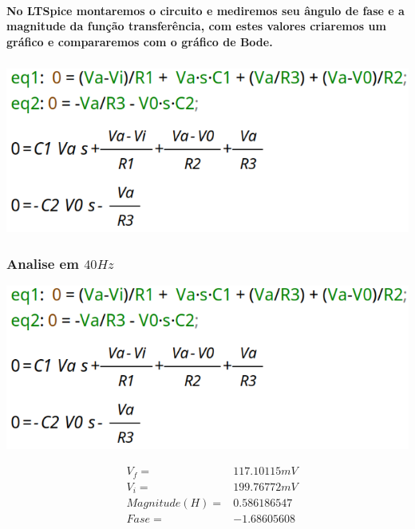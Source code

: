\documentclass[12pt,twoside, a4paper, twocolumn]{article}
\begin{document}
\paragraph*{No LTSpice montaremos o circuito e mediremos seu ângulo de fase e a magnitude da função transferência, com estes valores criaremos um gráfico e compararemos com o gráfico de Bode.}
\subparagraph*{}
\begin{adjustbox}{scale=0.09}
    \includegraphics{eqs.png}
\end{adjustbox}




\subsubsection{Analise em $40Hz$}




\begin{adjustbox}{scale=0.09}
    \includegraphics{eqs.png}
\end{adjustbox}




\begin{equation*}
    \begin{aligned}
         & V_f =          & 117.10115mV \\
         & V_i =          & 199.76772mV \\
         & Magnitude(H) = & 0.586186547 \\
         & Fase =         & -1.68605608
    \end{aligned}
\end{equation*}
\end{document}

